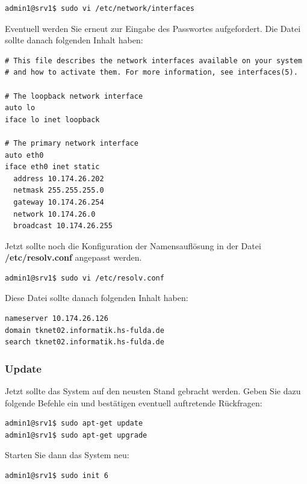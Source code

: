 \begin{lstlisting}
admin1@srv1$ sudo vi /etc/network/interfaces
\end{lstlisting}
Eventuell werden Sie erneut zur Eingabe des Passwortes aufgefordert. Die Datei sollte danach folgenden Inhalt haben:


\begin{lstlisting}
# This file describes the network interfaces available on your system
# and how to activate them. For more information, see interfaces(5).

# The loopback network interface
auto lo
iface lo inet loopback

# The primary network interface
auto eth0
iface eth0 inet static
  address 10.174.26.202
  netmask 255.255.255.0
  gateway 10.174.26.254
  network 10.174.26.0
  broadcast 10.174.26.255
\end{lstlisting}

Jetzt sollte noch die Konfiguration der Namensauflösung in der Datei \\ \textbf{/etc/resolv.conf} angepasst werden. 
\begin{lstlisting}
admin1@srv1$ sudo vi /etc/resolv.conf
\end{lstlisting}

Diese Datei sollte danach folgenden Inhalt haben:
\begin{lstlisting}
nameserver 10.174.26.126
domain tknet02.informatik.hs-fulda.de
search tknet02.informatik.hs-fulda.de
\end{lstlisting}

\subsubsection{Update}
Jetzt sollte das System auf den neusten Stand gebracht werden. Geben Sie dazu folgende Befehle ein und bestätigen eventuell auftretende Rückfragen:
\begin{lstlisting}
admin1@srv1$ sudo apt-get update
admin1@srv1$ sudo apt-get upgrade
\end{lstlisting}
Starten Sie dann das System neu:
\begin{lstlisting}
admin1@srv1$ sudo init 6
\end{lstlisting}